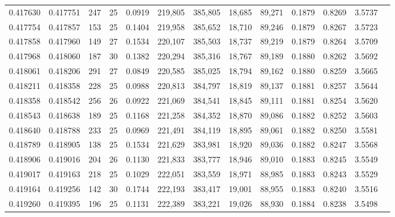 \begin{tabular}{rrrrrrrrrrrrr}
0.417630 & 0.417751 & 247 &  25 &                                     0.0919 & 219,805 & 385,805 &  18,685 &  89,271 & 0.1879 & 0.8269 & 3.5737 \\
0.417754 & 0.417857 & 153 &  25 &                                     0.1404 & 219,958 & 385,652 &  18,710 &  89,246 & 0.1879 & 0.8267 & 3.5723 \\
0.417858 & 0.417960 & 149 &  27 &                                     0.1534 & 220,107 & 385,503 &  18,737 &  89,219 & 0.1879 & 0.8264 & 3.5709 \\
0.417968 & 0.418060 & 187 &  30 &                                     0.1382 & 220,294 & 385,316 &  18,767 &  89,189 & 0.1880 & 0.8262 & 3.5692 \\
0.418061 & 0.418206 & 291 &  27 &                                     0.0849 & 220,585 & 385,025 &  18,794 &  89,162 & 0.1880 & 0.8259 & 3.5665 \\
0.418211 & 0.418358 & 228 &  25 &                                     0.0988 & 220,813 & 384,797 &  18,819 &  89,137 & 0.1881 & 0.8257 & 3.5644 \\
0.418358 & 0.418542 & 256 &  26 &                                     0.0922 & 221,069 & 384,541 &  18,845 &  89,111 & 0.1881 & 0.8254 & 3.5620 \\
0.418543 & 0.418638 & 189 &  25 &                                     0.1168 & 221,258 & 384,352 &  18,870 &  89,086 & 0.1882 & 0.8252 & 3.5603 \\
0.418640 & 0.418788 & 233 &  25 &                                     0.0969 & 221,491 & 384,119 &  18,895 &  89,061 & 0.1882 & 0.8250 & 3.5581 \\
0.418789 & 0.418905 & 138 &  25 &                                     0.1534 & 221,629 & 383,981 &  18,920 &  89,036 & 0.1882 & 0.8247 & 3.5568 \\
0.418906 & 0.419016 & 204 &  26 &                                     0.1130 & 221,833 & 383,777 &  18,946 &  89,010 & 0.1883 & 0.8245 & 3.5549 \\
0.419017 & 0.419163 & 218 &  25 &                                     0.1029 & 222,051 & 383,559 &  18,971 &  88,985 & 0.1883 & 0.8243 & 3.5529 \\
0.419164 & 0.419256 & 142 &  30 &                                     0.1744 & 222,193 & 383,417 &  19,001 &  88,955 & 0.1883 & 0.8240 & 3.5516 \\
0.419260 & 0.419395 & 196 &  25 &                                     0.1131 & 222,389 & 383,221 &  19,026 &  88,930 & 0.1884 & 0.8238 & 3.5498 \\

\end{tabular}
